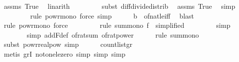 \begin{isabellebody}
\ assms\ True\ \isamarkupfalse%
\ linarith\isanewline
\ \ \ \ \ \ \ \isamarkupfalse%
\ {\isacharparenleft}{\kern0pt}subst\ diff{\isacharunderscore}{\kern0pt}divide{\isacharunderscore}{\kern0pt}distrib{\isacharparenright}{\kern0pt}\ \isamarkupfalse%
\ assms\ True\ \isamarkupfalse%
\ simp\isanewline
\ \ \ \ \ \ \ \isamarkupfalse%
\ {\isacharparenleft}{\kern0pt}rule\ powr{\isacharunderscore}{\kern0pt}mono{}{\isacharcomma}{\kern0pt}\ force{\isacharcomma}{\kern0pt}\ simp{\isacharparenright}{\kern0pt}\isanewline
\ \ \ \ \isamarkupfalse%
\ b{}\ \ of{\isacharunderscore}{\kern0pt}nat{\isacharunderscore}{\kern0pt}le{\isacharunderscore}{\kern0pt}iff\ \isamarkupfalse%
\ blast\isanewline
\ \ \ \ \ \ \isamarkupfalse%
\ {\isacharparenleft}{\kern0pt}rule\ powr{\isacharunderscore}{\kern0pt}mono{}{\isacharcomma}{\kern0pt}\ force{\isacharparenright}{\kern0pt}\isanewline
\ \ \ \ \ \ \ \isamarkupfalse%
\ {\isacharparenleft}{\kern0pt}rule\ sum{\isacharunderscore}{\kern0pt}mono{\isacharbrackleft}{\kern0pt}\ f{\isacharequal}{\kern0pt}{\isachardoublequoteopen}{\isasymlambda}{\isacharunderscore}{\kern0pt}{\isachardot}{\kern0pt}\ {}{\isachardoublequoteclose}{\isacharcomma}{\kern0pt}\ simplified{\isacharbrackright}{\kern0pt}{\isacharparenright}{\kern0pt}\isanewline
\ \ \ \ \ \ \ \isamarkupfalse%
\ simp\isanewline
\ \ \ \ \ \ \isamarkupfalse%
\ {\isacharparenleft}{\kern0pt}simp\ add{\isacharcolon}{\kern0pt}F{\isacharunderscore}{\kern0pt}def\ of{\isacharunderscore}{\kern0pt}rat{\isacharunderscore}{\kern0pt}sum\ of{\isacharunderscore}{\kern0pt}rat{\isacharunderscore}{\kern0pt}power{\isacharparenright}{\kern0pt}\isanewline
\ \ \ \ \isamarkupfalse%
\ {\isacharparenleft}{\kern0pt}rule\ sum{\isacharunderscore}{\kern0pt}mono{\isacharparenright}{\kern0pt}\isanewline
\ \ \ \ \ \ \isamarkupfalse%
\ {\isacharparenleft}{\kern0pt}subst\ powr{\isacharunderscore}{\kern0pt}realpow{\isacharcomma}{\kern0pt}\ simp{\isacharparenright}{\kern0pt}\isanewline
\ \ \ \ \isamarkupfalse%
\ count{\isacharunderscore}{\kern0pt}list{\isacharunderscore}{\kern0pt}gr{\isacharunderscore}{\kern0pt}{}\ \isanewline
\ \ \ \ \isamarkupfalse%
\ {\isacharparenleft}{\kern0pt}metis\ gr{}I\ not{\isacharunderscore}{\kern0pt}one{\isacharunderscore}{\kern0pt}le{\isacharunderscore}{\kern0pt}zero{\isacharcomma}{\kern0pt}\ simp{\isacharcomma}{\kern0pt}\ simp{\isacharcomma}{\kern0pt}\ simp{\isacharparenright}{\kern0pt}\isanewline

\end{isabellebody}
